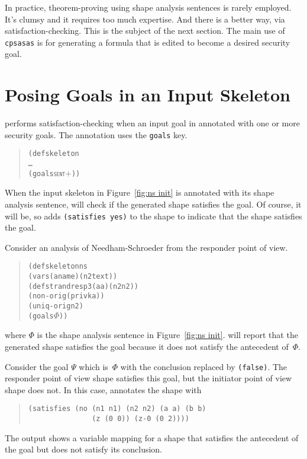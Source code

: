 \documentclass[12pt]{article}
\begin{document}
In practice, theorem-proving using shape analysis sentences is rarely
employed.  It's clumsy and it requires too much expertise.  And there
is a better way, via satisfaction-checking.  This is the subject of
the next section.  The main use of \texttt{cpsasas} is for generating
a formula that is edited to become a desired security goal.

\section{Posing Goals in an Input Skeleton}\label{sec:posing}

{\cpsa} performs satisfaction-checking when an input goal in annotated
with one or more security goals.  The annotation uses the
\texttt{goals} key.

\begin{quote}
  \begin{alltt}
(defskeleton
   \ldots
   (goals \textsc{sent\ensuremath{+}}))
  \end{alltt}
\end{quote}

When the input skeleton in Figure~\ref{fig:ns init} is annotated with
its shape analysis sentence, {\cpsa} will check if the generated shape
satisfies the goal.  Of course, it will be, so {\cpsa} adds
\texttt{(satisfies yes)} to the shape to indicate that the shape
satisfies the goal.

Consider an analysis of Needham-Schroeder from the responder point of view.
\begin{quote}
  \begin{alltt}
(defskeleton ns
  (vars (a name) (n2 text))
  (defstrand resp 3 (a a) (n2 n2))
  (non-orig (privk a))
  (uniq-orig n2)
  (goals \(\Phi\)))
  \end{alltt}
\end{quote}
where \(\Phi\) is the shape analysis sentence in Figure~\ref{fig:ns
  init}.  {\cpsa} will report that the generated shape satisfies the
goal because it does not satisfy the antecedent of~\(\Phi\).

Consider the goal \(\Psi\) which is~\(\Phi\) with the conclusion replaced
by \texttt{(false)}.  The responder point of view shape satisfies this
goal, but the initiator point of view shape does not.  In this case,
{\cpsa} annotates the shape with
\begin{quote}
\begin{verbatim}
(satisfies (no (n1 n1) (n2 n2) (a a) (b b)
               (z (0 0)) (z-0 (0 2))))
\end{verbatim}
\end{quote}
The output shows a variable mapping for a shape that satisfies the
antecedent of the goal but does not satisfy its conclusion.
\end{document}
